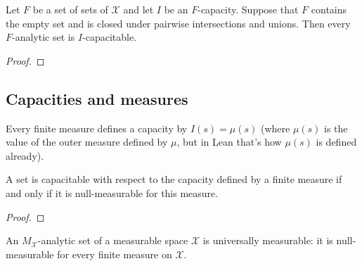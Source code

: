 \begin{theorem}\label{thm:IsPavingAnalytic.isCapacitable}
  \leanok
Let $F$ be a set of sets of $\mathcal{X}$ and let $I$ be an $F$-capacity.
Suppose that $F$ contains the empty set and is closed under pairwise intersections and unions.
Then every $F$-analytic set is $I$-capacitable.
\end{theorem}

\begin{proof}\leanok

\end{proof}



\subsection{Capacities and measures}


\begin{definition}\label{def:Measure.capacity}
  \leanok
Every finite measure defines a capacity by $I(s) = \mu(s)$ (where $\mu(s)$ is the value of the outer measure defined by $\mu$, but in Lean that's how $\mu(s)$ is defined already).
\end{definition}


\begin{lemma}\label{lem:Measure.isCapacitable_capacity_iff}
  \leanok
A set is capacitable with respect to the capacity defined by a finite measure if and only if it is null-measurable for this measure.
\end{lemma}

\begin{proof}\leanok

\end{proof}


\begin{lemma}\label{lem:IsPavingAnalytic.nullMeasurableSet}
  \leanok
An $M_{\mathcal{X}}$-analytic set of a measurable space $\mathcal{X}$ is universally measurable: it is null-measurable for every finite measure on $\mathcal{X}$.
\end{lemma}


